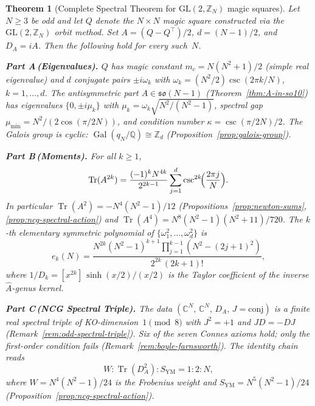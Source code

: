 \documentclass[aps,prd,twocolumn,superscriptaddress,floatfix,nofootinbib]{revtex4-2}
\newtheorem{theorem}{Theorem}
\theoremstyle{definition}
\theoremstyle{remark}
\begin{document}
\begin{theorem}[Complete Spectral Theorem for $\mathrm{GL}(2,\mathbb{Z}_N)$ magic squares]
\label{thm:complete-spectral}
Let $N \geq 3$ be odd and let $Q$ denote the $N\times N$ magic square
constructed via the $\mathrm{GL}(2,\mathbb{Z}_N)$ orbit method.
Set $A = (Q-Q^{\!\top})/2$, $d = (N{-}1)/2$, and $D_A = iA$.
Then the following hold for every such~$N$.

\smallskip
\noindent\textbf{Part A\,(Eigenvalues).}\enspace
$Q$ has magic constant $m_c = N(N^2{+}1)/2$ (simple real eigenvalue)
and $d$ conjugate pairs $\pm i\omega_k$ with
$\omega_k = (N^2/2)\csc(2\pi k/N)$, $k=1,\ldots,d$.
The antisymmetric part $A \in \mathfrak{so}(N{-}1)$
(Theorem~\textup{\ref{thm:A-in-so10}}) has eigenvalues
$\{0,\pm i\mu_k\}$ with $\mu_k = \omega_k\sqrt{N^2/(N^2{-}1)}$,
spectral gap $\mu_{\min} = N^2/(2\cos(\pi/2N))$,
and condition number $\kappa = \csc(\pi/2N)/2$.
The Galois group is cyclic: $\operatorname{Gal}(q_N/\mathbb{Q})
\cong \mathbb{Z}_d$
(Proposition~\textup{\ref{prop:galois-group}}).

\smallskip
\noindent\textbf{Part B\,(Moments).}\enspace
For all $k \geq 1$,
\begin{equation}\label{eq:newton-trace}
  \operatorname{Tr}(A^{2k})
  = \frac{(-1)^k N^{4k}}{2^{2k-1}}
    \sum_{j=1}^{d}\csc^{2k}\!\Bigl(\frac{2\pi j}{N}\Bigr).
\end{equation}
In particular $\operatorname{Tr}(A^2) = -N^4(N^2{-}1)/12$
(Propositions~\textup{\ref{prop:newton-sums},\,\ref{prop:ncg-spectral-action}})
and $\operatorname{Tr}(A^4) = N^8(N^2{-}1)(N^2{+}11)/720$.
The $k$-th elementary symmetric polynomial of $\{\omega_1^2,\ldots,\omega_d^2\}$ is
\[
  e_k(N) = \frac{N^{2k}(N^2{-}1)^{k+1}
    \prod_{j=1}^{k-1}(N^2{-}(2j{+}1)^2)}
    {2^{2k}\,(2k{+}1)!},
\]
where $1/D_k = [x^{2k}]\,\sinh(x/2)/(x/2)$
is the Taylor coefficient of the inverse $\hat{A}$-genus kernel.

\smallskip
\noindent\textbf{Part C\,(NCG Spectral Triple).}\enspace
The data $(\mathbb{C}^N,\,\mathbb{C}^N,\,D_A,\,J=\mathrm{conj})$
is a finite real spectral triple of KO-dimension~$1\pmod{8}$
with $J^2=+1$ and $JD=-DJ$
(Remark~\textup{\ref{rem:odd-spectral-triple}}).
Six of the seven Connes axioms hold; only the first-order condition fails
(Remark~\textup{\ref{rem:boyle-farnsworth}}).
The identity chain reads
\[
  W : \operatorname{Tr}(D_A^2) : S_{\mathrm{YM}}
  = 1 : 2 : N,
\]
where $W = N^4(N^2{-}1)/24$ is the Frobenius weight and
$S_{\mathrm{YM}} = N^5(N^2{-}1)/24$
(Proposition~\textup{\ref{prop:ncg-spectral-action}}).


\end{theorem}
\end{document}
